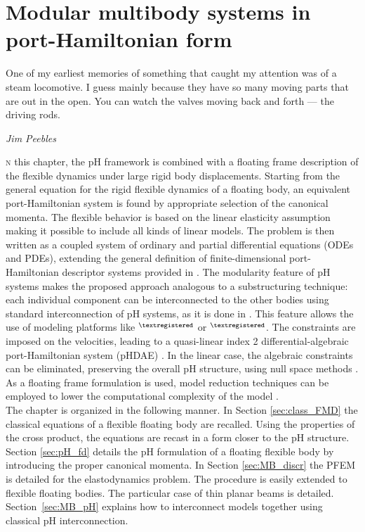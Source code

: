 \chapter{Modular multibody systems in port-Hamiltonian form}\label{ch:fmdPH}

\epigraph{One of my earliest memories of something that caught my attention was of a steam locomotive. I guess mainly because they have so many moving parts that are out in the open. You can watch the valves moving back and forth — the driving rods.}{\textit{Jim Peebles}}

\minitoc

\lettrine{\color{theme}{I}}n this chapter, the pH framework is combined with a floating frame description of the flexible dynamics under large rigid body displacements. Starting from the general equation for the rigid flexible dynamics of a floating body, an equivalent port-Hamiltonian system is found by appropriate selection of the canonical momenta. The flexible behavior is based on the linear elasticity assumption making it possible to include all kinds of linear models. The problem is then written as a coupled system of ordinary and partial differential equations (ODEs and PDEs), extending the general definition of finite-dimensional port-Hamiltonian descriptor systems provided in \cite{mehrmann2019structurepreserving}. The modularity feature of pH systems makes the proposed approach analogous to a substructuring technique: each individual component can be interconnected to the other bodies using standard interconnection of pH systems, as it is done in \cite{macchelli2007link}. This feature allows the use of modeling platforms like {}$^{\tiny{\textregistered}}$ or {}$^{\tiny{\textregistered}}$.  The constraints are imposed on the velocities, leading to a quasi-linear index 2 differential-algebraic port-Hamiltonian system (pHDAE) \cite{steinbrecher2006phd,beattie2018linear}. In the linear case, the algebraic constraints can be eliminated, preserving the overall pH structure, using null space methods \cite{leyendecker2008nullspace}.  As a floating frame formulation is used, model reduction techniques can be employed to lower the computational complexity of the model \cite{chaturantabut2016,egger2018}.  \\


\indent The chapter is organized in the following manner. In Section \ref{sec:class_FMD} the classical equations of a flexible floating body are recalled. Using the properties of the cross product, the equations are recast in a form closer to the pH structure. Section \ref{sec:pH_fd} details the pH formulation of a floating flexible body by introducing the proper canonical momenta. In Section \ref{sec:MB_discr} the PFEM is detailed for the elastodynamics problem. The procedure is easily extended to flexible floating bodies. The particular case of thin planar beams is detailed. Section~\ref{sec:MB_pH} explains how to interconnect models together using classical pH interconnection. 

